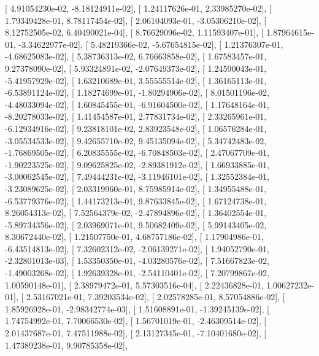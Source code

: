 \documentclass{article}
\begin{document}
       [  4.91054230e-02,  -8.18124911e-02],
       [  1.24117626e-01,   2.33985270e-02],
       [  1.79349428e-01,   8.78117454e-02],
       [  2.06104093e-01,  -3.05306210e-02],
       [  8.12752505e-02,   6.40490021e-04],
       [  8.76629096e-02,   1.11593407e-01],
       [  1.87964615e-01,  -3.34622977e-02],
       [  5.48219366e-02,  -5.67654815e-02],
       [  1.21376307e-01,  -4.68625083e-02],
       [  5.38736313e-02,   6.76663858e-02],
       [  1.67583457e-01,   9.27378090e-02],
       [  5.93324891e-02,  -2.07649373e-02],
       [  1.24590043e-01,  -5.41957929e-02],
       [  1.63210689e-01,   3.55555514e-02],
       [  1.36165113e-01,  -6.53891124e-02],
       [  1.18274699e-01,  -1.80294906e-02],
       [  8.01501196e-02,  -4.48033094e-02],
       [  1.60845455e-01,  -6.91604500e-02],
       [  1.17648164e-01,  -8.20278033e-02],
       [  1.41454587e-01,   2.77831734e-02],
       [  2.33265961e-01,  -6.12934916e-02],
       [  9.23818101e-02,   2.83923548e-02],
       [  1.06576284e-01,  -3.05534533e-02],
       [  9.42655710e-02,   9.45135094e-02],
       [  5.34742483e-02,  -1.76869505e-02],
       [  6.20835555e-02,  -6.70848503e-02],
       [  2.47067709e-01,  -1.90223525e-02],
       [  9.09625825e-02,  -2.89381912e-02],
       [  1.66933885e-01,  -3.00062545e-02],
       [  7.49444231e-02,  -3.11946101e-02],
       [  1.32552384e-01,  -3.23089625e-02],
       [  2.03319960e-01,   8.75985914e-02],
       [  1.34955488e-01,  -6.53779376e-02],
       [  1.44173213e-01,   9.87633845e-02],
       [  1.67124738e-01,   8.26054313e-02],
       [  7.52564379e-02,  -2.47894896e-02],
       [  1.36402554e-01,  -5.89734356e-02],
       [  2.03969071e-01,   9.50682409e-02],
       [  5.99143405e-02,   8.30672440e-02],
       [  1.21507750e-01,   4.68757186e-02],
       [  1.17904986e-01,  -6.43514813e-02],
       [  7.32602312e-02,  -2.06139271e-02],
       [  1.94052790e-01,  -2.32801013e-03],
       [  1.53350350e-01,  -4.03280576e-02],
       [  7.51667823e-02,  -1.49003268e-02],
       [  1.92639328e-01,  -2.54110401e-02],
       [  7.20799867e-02,   1.00590148e-01],
       [  2.38979472e-01,   5.57303516e-04],
       [  2.22436828e-01,   1.00627232e-01],
       [  2.53167021e-01,   7.39203534e-02],
       [  2.02578285e-01,   8.57054886e-02],
       [  1.85926928e-01,  -2.98342774e-03],
       [  1.51608891e-01,  -1.39245139e-02],
       [  1.74754992e-01,   7.70066530e-02],
       [  1.56701019e-01,  -2.46309514e-02],
       [  2.01437687e-01,   7.47511988e-02],
       [  2.13127345e-01,  -7.10401680e-02],
       [  1.47389238e-01,   9.90785358e-02],
\end{document}
